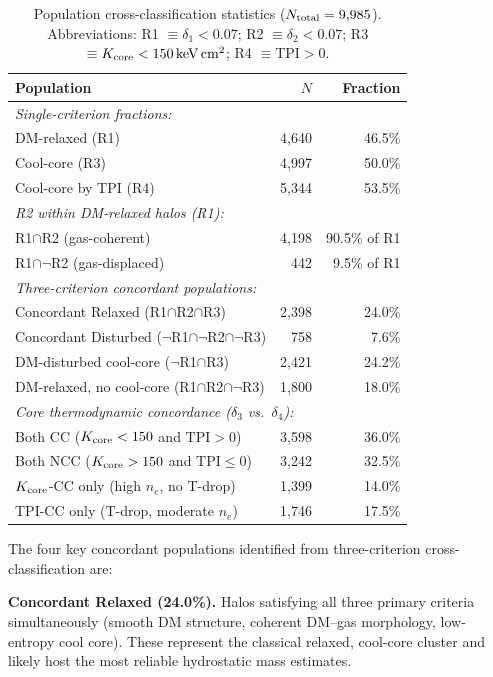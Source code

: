 \documentclass[12pt]{article}
\newcommand{\Kcore}{K_{\rm core}}
\newcommand{\TPI}{\mathrm{TPI}}
\newcommand{\deltai}{\delta_1}
\newcommand{\deltaii}{\delta_2}
\newcommand{\deltaiii}{\delta_3}
\newcommand{\deltaiv}{\delta_4}
\newcommand{\kevcm}{{\rm keV\,cm^2}}
\begin{document}
\begin{table}[htbp]
\centering
\caption{Population cross-classification statistics ($N_{\rm total}=9{,}985$).
  Abbreviations: R1 $\equiv \deltai<0.07$; R2 $\equiv \deltaii<0.07$;
  R3 $\equiv \Kcore < 150\,\kevcm$; R4 $\equiv \TPI > 0$.}
\label{tab:populations}
\begin{tabular}{lrr}
\toprule
Population & $N$ & Fraction \\
\midrule
\multicolumn{3}{l}{\textit{Single-criterion fractions:}} \\
DM-relaxed (R1)            & 4{,}640 & 46.5\% \\
Cool-core (R3)             & 4{,}997 & 50.0\% \\
Cool-core by TPI (R4)      & 5{,}344 & 53.5\% \\[3pt]
\multicolumn{3}{l}{\textit{R2 within DM-relaxed halos (R1):}} \\
R1$\cap$R2 (gas-coherent)  & 4{,}198 & 90.5\% of R1 \\
R1$\cap\lnot$R2 (gas-displaced) & 442 & 9.5\% of R1 \\[3pt]
\multicolumn{3}{l}{\textit{Three-criterion concordant populations:}} \\
Concordant Relaxed (R1$\cap$R2$\cap$R3) & 2{,}398 & 24.0\% \\
Concordant Disturbed ($\lnot$R1$\cap\lnot$R2$\cap\lnot$R3) & 758 & 7.6\% \\
DM-disturbed cool-core ($\lnot$R1$\cap$R3) & 2{,}421 & 24.2\% \\
DM-relaxed, no cool-core (R1$\cap$R2$\cap\lnot$R3) & 1{,}800 & 18.0\% \\[3pt]
\multicolumn{3}{l}{\textit{Core thermodynamic concordance ($\deltaiii$ vs.\ $\deltaiv$):}} \\
Both CC ($\Kcore<150$ and $\TPI>0$)         & 3{,}598 & 36.0\% \\
Both NCC ($\Kcore>150$ and $\TPI \le 0$)    & 3{,}242 & 32.5\% \\
$\Kcore$-CC only (high $n_e$, no T-drop)    & 1{,}399 & 14.0\% \\
TPI-CC only (T-drop, moderate $n_e$)        & 1{,}746 & 17.5\% \\
\bottomrule
\end{tabular}
\end{table}

The four key concordant populations identified from three-criterion cross-classification are:

\textbf{Concordant Relaxed (24.0\%).}
Halos satisfying all three primary criteria simultaneously (smooth DM structure, coherent
DM--gas morphology, low-entropy cool core).  These represent the classical relaxed,
cool-core cluster and likely host the most reliable hydrostatic mass estimates.
\end{document}
